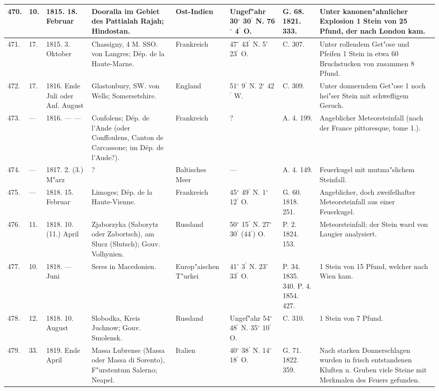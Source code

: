 \documentclass[a4paper, 8pt, oneside, polutonikogreek, german]{article}
\begin{document}
\begin{center}
\begin{longtable}{| p{4mm} | p{2mm} | p{15mm} | p{25mm} | p{16mm} | p{12mm} | p{13mm} | p{20mm} |}
        470. & 10. & 1815. 18. Februar & Dooralla im Gebiet des Pattialah Rajah; Hindostan. & Ost-Indien & Ungef"ahr 30$^\circ$ 30$^\prime$ N. 76$^\circ$ 4$^\prime$ O. & G. 68. 1821. 333. & Unter kanonen"ahnlicher Explosion 1 Stein von 25 Pfund, der nach London kam. \\ \hline
        471. & 17. & 1815. 3. Oktober & Chassigny, 4 M. SSO. von Langres; Dép. de la Haute-Marne. & Frankreich & 47$^\circ$ 43$^\prime$ N. 5$^\circ$ 23$^\prime$ O. & C. 307. & Unter rollendem Get"ose und Pfeifen 1 Stein in etwa 60 Bruchstucken von zusammen 8 Pfund. \\ \hline
        472. & 17. & 1816. Ende Juli oder Anf. August & Glastonbury, SW. von Wells; Somersetshire. & England & 51$^\circ$ 9$^\prime$ N. 2$^\circ$ 42$^\prime$ W. & C. 309. & Unter donnerndem Get"ose 1 noch hei"ser Stein mit schwefligem Geruch. \\ \hline
        473. & --- & 1816. --- --- & Confolens; Dép. de l’Ande (oder Conffoulens, Canton de Carcassone; im Dép. de l’Aude?). & Frankreich & ? & A. 4. 199. & Angeblicher Meteorsteinfall (nach der France pittoresque, tome 1.). \\ \hline
        474. & --- & 1817. 2. (3.) M"arz & ? & Baltisches Meer & --- & A. 4. 149. & Feuerkugel mit mutma"slichem Steinfall. \\ \hline
        475. & --- & 1818. 15. Februar & Limoges; Dép. de la Haute-Vienne. & Frankreich & 45$^\circ$ 49$^\prime$ N. 1$^\circ$ 12$^\prime$ O. & G. 60. 1818. 251. & Angeblicher, doch zweifelhafter Meteorsteinfall aus einer Feuerkugel. \\ \hline
        476. & 11. & 1818. 10. (11.) April & Zjaborzyka (Saborytz oder Zabortsch), am Slucz (Slutsch); Gouv. Volhynien. & Russland & 50$^\circ$ 15$^\prime$ N. 27$^\circ$ 30$^\prime$ (44$^\prime$) O. & P. 2. 1824. 153. & Meteorsteinfall; der Stein ward von Laugier analysiert. \\ \hline
        477. & 10. & 1818. --- Juni & Seres in Macedonien. & Europ"aischen T"urkei & 41$^\circ$ 3$^\prime$ N. 23$^\circ$ 33$^\prime$ O. & P. 34. 1835. 340. P. 4. 1854. 427. & 1 Stein von 15 Pfund, welcher nach Wien kam. \\ \hline
        478. & 12. & 1818. 10. August & Slobodka, Kreis Juchnow; Gouv. Smolensk. & Russland & Ungef"ahr 54$^\circ$ 48$^\prime$ N. 35$^\circ$ 10$^\prime$ O. & C. 310. & 1 Stein von 7 Pfund. \\ \hline
        479. & 33. & 1819. Ende April & Massa Lubrense (Massa oder Massa di Sorento), F"urstentum Salerno; Neapel. & Italien & 40$^\circ$ 38$^\prime$ N. 14$^\circ$ 18$^\prime$ O. & G. 71. 1822. 359. & Nach starken Donnerschlagen wurden in frisch entstandenen Kluften u. Gruben viele Steine mit Merkmalen des Feuers gefunden. \\ \hline

\end{longtable}
\end{center}
\end{document}
